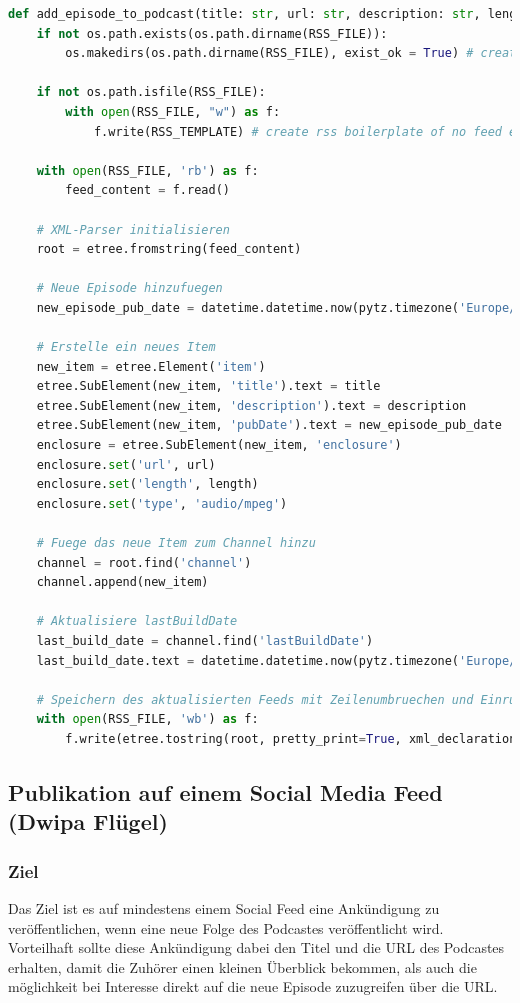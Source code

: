 \documentclass{article}
\begin{document}
\begin{lstlisting}[language=Python, caption=Vollständige Funktion des RSS-Feed Generators]
def add_episode_to_podcast(title: str, url: str, description: str, length: str):
    if not os.path.exists(os.path.dirname(RSS_FILE)):
        os.makedirs(os.path.dirname(RSS_FILE), exist_ok = True) # create file path if it doesn't exist

    if not os.path.isfile(RSS_FILE):
        with open(RSS_FILE, "w") as f:
            f.write(RSS_TEMPLATE) # create rss boilerplate of no feed exists

    with open(RSS_FILE, 'rb') as f:
        feed_content = f.read()

    # XML-Parser initialisieren
    root = etree.fromstring(feed_content)

    # Neue Episode hinzufuegen
    new_episode_pub_date = datetime.datetime.now(pytz.timezone('Europe/Berlin')).strftime('%a, %d %b %Y %H:%M:%S %z')

    # Erstelle ein neues Item
    new_item = etree.Element('item')
    etree.SubElement(new_item, 'title').text = title
    etree.SubElement(new_item, 'description').text = description
    etree.SubElement(new_item, 'pubDate').text = new_episode_pub_date
    enclosure = etree.SubElement(new_item, 'enclosure')
    enclosure.set('url', url)
    enclosure.set('length', length)
    enclosure.set('type', 'audio/mpeg')

    # Fuege das neue Item zum Channel hinzu
    channel = root.find('channel')
    channel.append(new_item)
    
    # Aktualisiere lastBuildDate
    last_build_date = channel.find('lastBuildDate')
    last_build_date.text = datetime.datetime.now(pytz.timezone('Europe/Berlin')).strftime('%a, %d %b %Y %H:%M:%S %z')

    # Speichern des aktualisierten Feeds mit Zeilenumbruechen und Einrueckungen
    with open(RSS_FILE, 'wb') as f:
        f.write(etree.tostring(root, pretty_print=True, xml_declaration=True, encoding='UTF-8'))
\end{lstlisting}

\subsection{Publikation auf einem Social Media Feed \small{(Dwipa Flügel)}}

\subsubsection{Ziel}
Das Ziel ist es auf mindestens einem Social Feed eine Ankündigung zu veröffentlichen, wenn eine neue Folge des Podcastes veröffentlicht wird. Vorteilhaft sollte diese Ankündigung dabei den Titel und die URL des Podcastes erhalten, damit die Zuhörer einen kleinen Überblick bekommen, als auch die möglichkeit bei Interesse direkt auf die neue Episode zuzugreifen über die URL.
\end{document}
